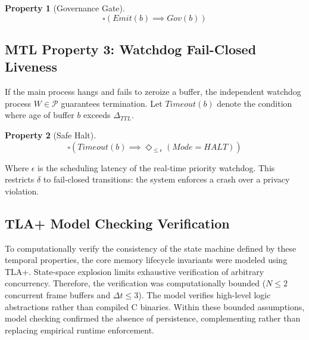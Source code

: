 \documentclass[conference]{IEEEtran}
\newtheorem{property}{Property}
\begin{document}
\begin{property}[Governance Gate]
\begin{equation}
\square \left( Emit(b) \implies Gov(b) \right)
\end{equation}
\end{property}

\subsection{MTL Property 3: Watchdog Fail-Closed Liveness}
If the main process hangs and fails to zeroize a buffer, the independent watchdog process $W \in \mathcal{P}$ guarantees termination. Let $Timeout(b)$ denote the condition where age of buffer $b$ exceeds $\Delta_{TTL}$.

\begin{property}[Safe Halt]
\begin{equation}
\square \left( Timeout(b) \implies \Diamond_{\le \epsilon} (Mode = HALT) \right)
\end{equation}
\end{property}
Where $\epsilon$ is the scheduling latency of the real-time priority watchdog. This restricts $\delta$ to fail-closed transitions: the system enforces a crash over a privacy violation.

\subsection{TLA+ Model Checking Verification}
To computationally verify the consistency of the state machine defined by these temporal properties, the core memory lifecycle invariants were modeled using TLA+. State-space explosion limits exhaustive verification of arbitrary concurrency. Therefore, the verification was computationally bounded ($N \le 2$ concurrent frame buffers and $\Delta t \le 3$). The model verifies high-level logic abstractions rather than compiled C binaries. Within these bounded assumptions, model checking confirmed the absence of persistence, complementing rather than replacing empirical runtime enforcement.
\end{document}
